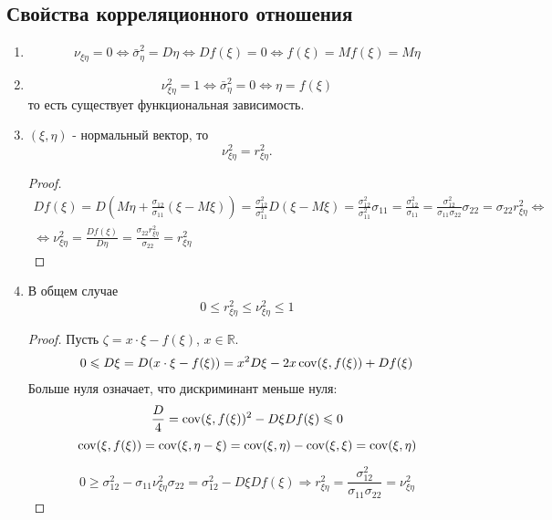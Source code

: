 \subsection{Свойства корреляционного отношения}
\begin{enumerate}
  \item 
    \[
      \nu_{\xi\eta} = 0 \Leftrightarrow \bar\sigma^2_\eta = D\eta \Leftrightarrow Df(\xi) = 0 \Leftrightarrow f(\xi) = Mf(\xi) = M\eta
    \]
  \item
    \[
    \nu_{\xi\eta}^2 = 1 \Leftrightarrow \bar\sigma_\eta^2 = 0 \Leftrightarrow \eta = f(\xi)
    \]
    то есть существует функциональная зависимость.

  \item $(\xi, \eta)$ - нормальный вектор, то 
    \[
      \nu_{\xi\eta}^2 = r_{\xi\eta}^2.
    \]
    \begin{proof}
      \begin{multline*}
        Df(\xi) = D(M\eta + \frac{\sigma_{12}}{\sigma_{11}} (\xi - M\xi))
        = \frac{\sigma_{12}^2}{\sigma_{11}^2} D(\xi - M\xi)
        = \frac{\sigma_{12}^2}{\sigma_{11}^2} \sigma_{11}
        = \frac{\sigma_{12}^2}{\sigma_{11}}
        = \frac{\sigma_{12}^2}{\sigma_{11} \sigma_{22}} \sigma_{22}
        = \sigma_{22} r_{\xi\eta}^2
        \Leftrightarrow \\
        \Leftrightarrow
        \nu_{\xi\eta}^2 = \frac{Df(\xi)}{D\eta} = \frac{\sigma_{22} r_{\xi\eta}^2}{\sigma_{22}} = r_{\xi\eta}^2
      \end{multline*}
    \end{proof}

  \item В общем случае
    \[
      0 \leqslant r_{\xi\eta}^2 \leqslant \nu_{\xi\eta}^2 \leqslant 1
    \]
    \begin{proof}
      Пусть $\zeta = x \cdot \xi - f(\xi)$, $x\in\mathbb{R}$.
      \begin{multline*}
        0 \leqslant D\xi = D(x \cdot \xi - f(\xi)) = x^2 D\xi - 2 x \operatorname{cov} (\xi, f(\xi)) + D f(\xi)
      \end{multline*}
      Больше нуля означает, что дискриминант меньше нуля:
      \[
        \frac{D}{4} = \operatorname{cov}(\xi, f(\xi))^2 - D\xi Df(\xi) \leqslant 0
      \]
      \[
        \operatorname{cov}(\xi, f(\xi)) = \operatorname{cov}(\xi, \eta - \xi)
        = \operatorname{cov}(\xi, \eta) - \operatorname{cov}(\xi, \xi) = \operatorname{cov}(\xi, \eta)
      \]

      \[
        0 \geqslant \sigma_{12}^2 - \sigma_{11} \nu_{\xi\eta}^2 \sigma_{22} = \sigma_{12}^2 - D\xi Df(\xi) \Rightarrow r_{\xi\eta}^2 = \frac{\sigma_{12}^2}{\sigma_{11} \sigma_{22}} = \nu_{\xi\eta}^2
      \]
    \end{proof}
\end{enumerate}

